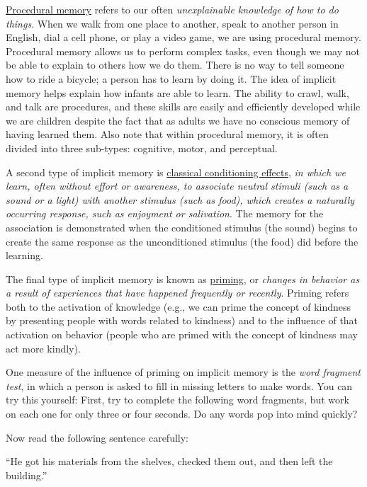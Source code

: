 \documentclass[
]{krantz}
\begin{document}
\protect\hyperlink{procedural-memory}{Procedural memory} refers to our often \emph{unexplainable knowledge of how to do things}. When we walk from one place to another, speak to another person in English, dial a cell phone, or play a video game, we are using procedural memory. Procedural memory allows us to perform complex tasks, even though we may not be able to explain to others how we do them. There is no way to tell someone how to ride a bicycle; a person has to learn by doing it. The idea of implicit memory helps explain how infants are able to learn. The ability to crawl, walk, and talk are procedures, and these skills are easily and efficiently developed while we are children despite the fact that as adults we have no conscious memory of having learned them. Also note that within procedural memory, it is often divided into three sub-types: cognitive, motor, and perceptual.

A second type of implicit memory is \protect\hyperlink{classical-conditioning-effects}{classical conditioning effects}, \emph{in which we learn, often without effort or awareness, to associate neutral stimuli (such as a sound or a light) with another stimulus (such as food), which creates a naturally occurring response, such as enjoyment or salivation}. The memory for the association is demonstrated when the conditioned stimulus (the sound) begins to create the same response as the unconditioned stimulus (the food) did before the learning.

The final type of implicit memory is known as \protect\hyperlink{priming}{priming}, or \emph{changes in behavior as a result of experiences that have happened frequently or recently}. Priming refers both to the activation of knowledge (e.g., we can prime the concept of kindness by presenting people with words related to kindness) and to the influence of that activation on behavior (people who are primed with the concept of kindness may act more kindly).

One measure of the influence of priming on implicit memory is the \emph{word fragment test}, in which a person is asked to fill in missing letters to make words. You can try this yourself: First, try to complete the following word fragments, but work on each one for only three or four seconds. Do any words pop into mind quickly?

Now read the following sentence carefully:

``He got his materials from the shelves, checked them out, and then left the building.''
\end{document}
